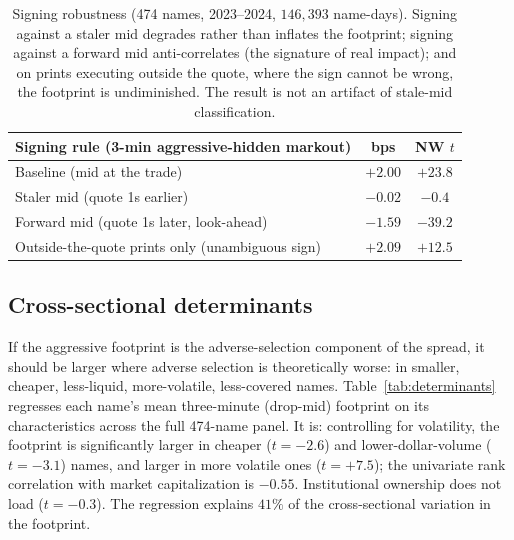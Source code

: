 \documentclass[11pt]{article}
\begin{document}
\begin{table}[htbp]
\centering
\begin{tabular}{lcc}
\toprule
\textbf{Signing rule (3-min aggressive-hidden markout)} & \textbf{bps} & \textbf{NW $t$} \\
\midrule
Baseline (mid at the trade) & $+2.00$ & $+23.8$ \\
Staler mid (quote 1s earlier) & $-0.02$ & $-0.4$ \\
Forward mid (quote 1s later, look-ahead) & $-1.59$ & $-39.2$ \\
Outside-the-quote prints only (unambiguous sign) & $+2.09$ & $+12.5$ \\
\bottomrule
\end{tabular}
\caption{Signing robustness (474 names, 2023--2024, $146{,}393$ name-days). Signing against
a staler mid degrades rather than inflates the footprint; signing against a forward mid
anti-correlates (the signature of real impact); and on prints executing outside the quote,
where the sign cannot be wrong, the footprint is undiminished. The result is not an artifact
of stale-mid classification.}
\label{tab:signrobust}
\end{table}

\subsection{Cross-sectional determinants}
\label{sub:determinants}
If the aggressive footprint is the adverse-selection component of the spread, it should be
larger where adverse selection is theoretically worse: in smaller, cheaper, less-liquid,
more-volatile, less-covered names. Table~\ref{tab:determinants} regresses each name's
mean three-minute (drop-mid) footprint on its characteristics across the full 474-name
panel. It is: controlling for volatility, the footprint is significantly larger in cheaper
($t{=}{-}2.6$) and lower-dollar-volume ($t{=}{-}3.1$) names, and larger in more volatile
ones ($t{=}{+}7.5$); the univariate rank correlation with market capitalization is
$-0.55$. Institutional ownership does not load ($t{=}{-}0.3$). The regression explains
$41\%$ of the cross-sectional variation in the footprint.
\end{document}
